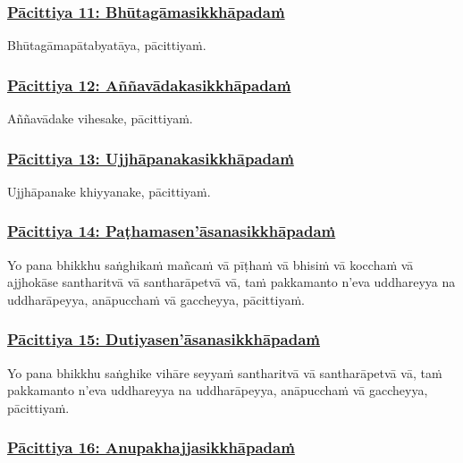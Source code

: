 \subsubsection*{\hyperref[exp11]{Pācittiya 11: Bhūtagāmasikkhāpadaṁ}}
\label{pac11}

Bhūtagāmapātabyatāya, pācittiyaṁ.

\subsubsection*{\hyperref[exp12]{Pācittiya 12: Aññavādakasikkhāpadaṁ}}
\label{pac12}

Aññavādake vihesake, pācittiyaṁ.

\subsubsection*{\hyperref[exp13]{Pācittiya 13: Ujjhāpanakasikkhāpadaṁ}}
\label{pac13}

Ujjhāpanake khiyyanake, pācittiyaṁ.

\subsubsection*{\hyperref[exp14]{Pācittiya 14: Paṭhamasen'āsanasikkhāpadaṁ}}
\label{pac14}

Yo pana bhikkhu saṅghikaṁ mañcaṁ vā pīṭhaṁ vā bhisiṁ vā kocchaṁ vā ajjhokāse santharitvā vā santharāpetvā vā, taṁ pakkamanto n'eva uddhareyya na uddharāpeyya, anāpucchaṁ vā gaccheyya, pācittiyaṁ.

\subsubsection*{\hyperref[exp15]{Pācittiya 15: Dutiyasen'āsanasikkhāpadaṁ}}
\label{pac15}

Yo pana bhikkhu saṅghike vihāre seyyaṁ santharitvā vā santharāpetvā vā, taṁ pakkamanto n'eva uddhareyya na uddharāpeyya, anāpucchaṁ vā gaccheyya, pācittiyaṁ.

\subsubsection*{\hyperref[exp16]{Pācittiya 16: Anupakhajjasikkhāpadaṁ}}
\label{pac16}

